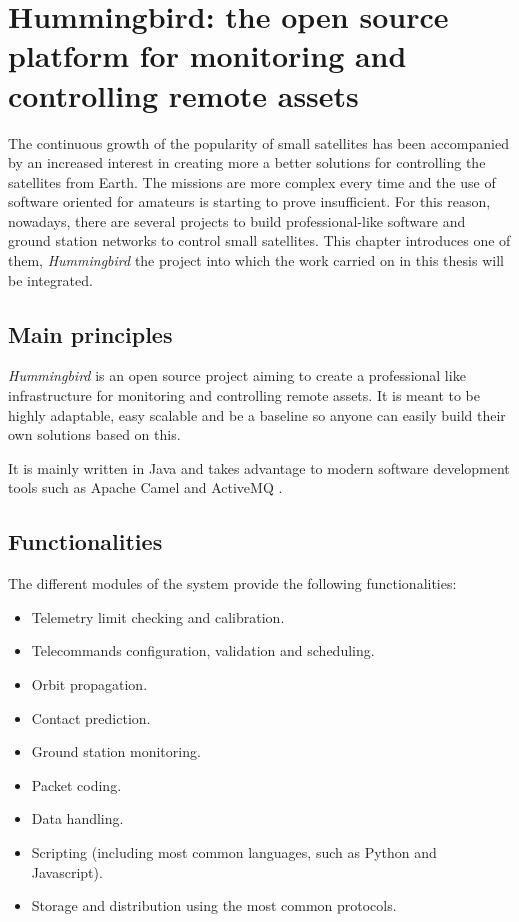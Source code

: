 
\chapter{Hummingbird: the open source platform for monitoring and controlling remote assets}\label{chapter3}

The continuous growth of the popularity of small satellites has been accompanied by an increased interest in creating more a better solutions for controlling the satellites from Earth. The missions are more complex every time and the use of software oriented for amateurs is starting to prove insufficient. For this reason, nowadays, there are  several projects to build professional-like software and ground station networks to control small satellites. This chapter introduces one of them, \emph{Hummingbird} \citep{HBird} the project into which the work carried on in this thesis will be integrated. 

\section{Main principles} 

\emph{Hummingbird} is an open source project aiming to create a professional like infrastructure for monitoring and controlling remote assets. It is meant to be highly adaptable, easy scalable and be a baseline so anyone can easily build their own solutions based on this. 

It is mainly written in Java \cite{Java} and takes advantage to modern software development tools such as Apache Camel \cite{Camel} and ActiveMQ \cite{AMQ}. 
\pagebreak
\section{Functionalities}

The different modules of the system provide the following functionalities: \cite{Elo}

\begin{itemize}
\item Telemetry limit checking and calibration.
\item Telecommands configuration, validation and scheduling.
\item Orbit propagation.
\item Contact prediction.
\item Ground station monitoring.
\item Packet coding.
\item Data handling.
\item Scripting (including most common languages, such as Python and Javascript).
\item Storage and distribution using the most common protocols.

\end{itemize}



